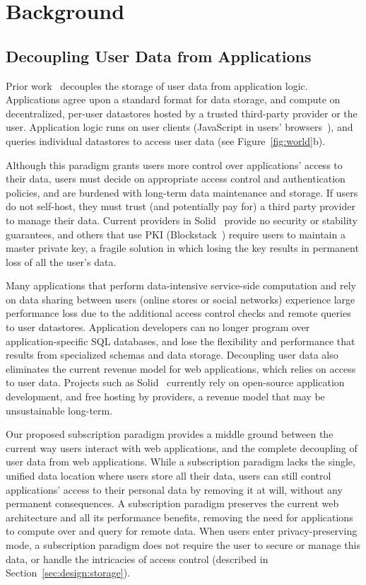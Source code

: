 \section{Background}

\subsection{Decoupling User Data from Applications}
Prior work~\cite{solid, amber, w5, blockstack, bstore} decouples the storage of user data
from application logic. Applications agree upon a standard format for data storage, and compute on
decentralized, per-user datastores hosted by a trusted third-party provider or the user.
Application logic runs on user clients (\eg JavaScript in users' browsers~\cite{solid,
blockstack, bstore}), and queries individual datastores to access user data (see Figure~\ref{fig:world}b).

Although this paradigm grants users more control over applications' access to their data, users must
decide on appropriate access control and authentication policies, and are burdened with long-term
data maintenance and storage. If users do not self-host, they must trust (and
potentially pay for) a third party provider to manage their data. Current providers in
Solid~\cite{solid} provide no security or stability guarantees, and others that use PKI (\eg Blockstack~\cite{blockstack}) require users to maintain a master private key, a fragile solution in which losing the key results in permanent loss of all the user's data.

Many applications that perform data-intensive service-side computation and rely on data sharing
between users (\eg online stores or social networks) experience large performance loss due to the
additional access control checks and remote queries to user datastores. Application
developers can no longer program over application-specific SQL databases, and lose the flexibility and performance that results from specialized schemas and data storage.
Decoupling user data also eliminates the current revenue model for web applications, which relies on access
to user data. Projects such as Solid~\cite{solid} currently rely on open-source application
development, and free hosting by providers, a revenue model that may be unsustainable
long-term.

Our proposed subscription paradigm provides a middle ground between the current way users interact
with web applications, and the complete decoupling of user data from web applications. While a
subscription paradigm lacks the single, unified data location where users store all their data,
users can still control applications' access to their personal data by removing it at will, without
any permanent consequences.  A subscription paradigm preserves the current web architecture and all
its performance benefits, removing the need for applications to compute over and query for remote
data.  When users enter privacy-preserving mode, a subscription paradigm does not require the user
to secure or manage this data, or handle the intricacies of access control (described in
Section~\ref{sec:design:storage}).

